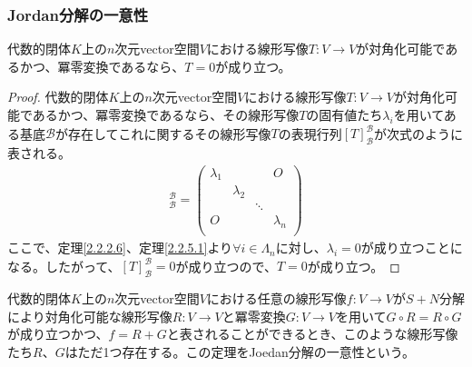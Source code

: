 \documentclass[dvipdfmx]{jsarticle}
\begin{document}
\subsubsection{Jordan分解の一意性}%
\begin{thm}\label{2.2.7.5}
代数的閉体$K$上の$n$次元vector空間$V$における線形写像$T:V \rightarrow V$が対角化可能であるかつ、冪零変換であるなら、$T = 0$が成り立つ。
\end{thm}
\begin{proof}
代数的閉体$K$上の$n$次元vector空間$V$における線形写像$T:V \rightarrow V$が対角化可能であるかつ、冪零変換であるなら、その線形写像$T$の固有値たち$\lambda_{i}$を用いてある基底$\mathcal{B}$が存在してこれに関するその線形写像$T$の表現行列$[T]_{\mathcal{B}}^{\mathcal{B}}$が次式のように表される。
\begin{align*}
[T]_{\mathcal{B}}^{\mathcal{B}} = \begin{pmatrix}
\lambda_{1} & \  & \  & O \\
\  & \lambda_{2} & \  & \  \\
\  & \  & \ddots & \  \\
O & \  & \  & \lambda_{n} \\
\end{pmatrix}
\end{align*}
ここで、定理\ref{2.2.2.6}、定理\ref{2.2.5.1}より$\forall i \in \varLambda_{n}$に対し、$\lambda_{i} = 0$が成り立つことになる。したがって、$[T]_{\mathcal{B}}^{\mathcal{B}} = 0$が成り立つので、$T = 0$が成り立つ。
\end{proof}
\begin{thm}[Jordan分解の一意性]\label{2.2.7.6}
代数的閉体$K$上の$n$次元vector空間$V$における任意の線形写像$f:V \rightarrow V$が$S + N$分解により対角化可能な線形写像$R:V \rightarrow V$と冪零変換$G:V \rightarrow V$を用いて$G \circ R = R \circ G$が成り立つかつ、$f = R + G$と表されることができるとき、このような線形写像たち$R$、$G$はただ1つ存在する。この定理をJoedan分解の一意性という。
\end{thm}
\end{document}
